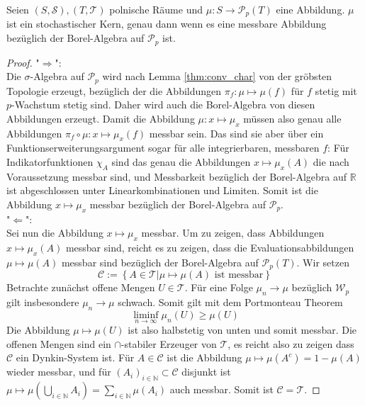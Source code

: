 \begin{lemma}\label{thm:kernel_characterization}
    Seien $(S, \mathcal{S}), (T, \mathcal{T})$ polnische Räume und $\mu: S\rightarrow \mathcal{P}_p(T)$ eine Abbildung. $\mu$ ist ein stochastischer Kern, genau dann wenn es eine messbare Abbildung bezüglich der Borel-Algebra auf $\mathcal{P}_p$ ist.
\end{lemma}
\begin{proof}
"$\Rightarrow$": \\
Die $\sigma$-Algebra auf $\mathcal{P}_p$ wird nach Lemma \ref{thm:conv_char} von der gröbsten Topologie erzeugt, bezüglich der die Abbildungen $\pi_f: \mu \mapsto \mu(f)$ für $f$ stetig mit $p$-Wachstum stetig sind. Daher wird auch die Borel-Algebra von diesen Abbildungen erzeugt. Damit die Abbildung $\mu: x\mapsto \mu_x$ müssen also genau alle Abbildungen $\pi_f \circ \mu: x\mapsto \mu_x(f)$ messbar sein. Das sind sie aber über ein Funktionserweiterungsargument sogar für alle integrierbaren, messbaren $f$: Für Indikatorfunktionen $\chi_A$ sind das genau die Abbildungen $x\mapsto \mu_x(A)$ die nach Voraussetzung messbar sind, und Messbarkeit bezüglich der Borel-Algebra auf $\mathbb{R}$ ist abgeschlossen unter Linearkombinationen und Limiten. Somit ist die Abbildung $x \mapsto \mu_x$ messbar bezüglich der Borel-Algebra auf $\mathcal{P}_p$. \\
"$\Leftarrow$": \\
Sei nun die Abbildung $x \mapsto \mu_x$ messbar. Um zu zeigen, dass Abbildungen $x\mapsto \mu_x(A)$ messbar sind, reicht es zu zeigen, dass die Evaluationsabbildungen $\mu \mapsto \mu(A)$ messbar sind bezüglich der Borel-Algebra auf $\mathcal{P}_p(T)$. Wir setzen
$$\mathcal{C}:=\left\{A \in \mathcal{T} \vert \mu \mapsto \mu(A) \text{ ist messbar}\right\}$$
Betrachte zunächst offene Mengen $U\in \mathcal{T}$. Für eine Folge $\mu_n \rightarrow \mu$ bezüglich $\mathcal{W}_p$ gilt insbesondere $\mu_n\rightarrow \mu$ schwach. Somit gilt mit dem Portmonteau Theorem
$$\liminf_{n\rightarrow\infty}\mu_n(U) \geq \mu(U)$$
Die Abbildung $\mu \mapsto \mu(U)$ ist also halbstetig von unten und somit messbar. Die offenen Mengen sind ein $\cap$-stabiler Erzeuger von $\mathcal{T}$, es reicht also zu zeigen dass $\mathcal{C}$ ein Dynkin-System ist. Für $A\in\mathcal{C}$ ist die Abbildung $\mu \mapsto \mu(A^c)=1-\mu(A)$ wieder messbar, und für $(A_i)_{i\in\mathbb{N}}\subset \mathcal{C}$ disjunkt ist 
$\mu\mapsto \mu(\bigcup_{i\in\mathbb{N}}A_i)=\sum_{i\in\mathbb{N}}\mu(A_i)$ auch messbar. Somit ist $\mathcal{C}=\mathcal{T}$.
\end{proof}
